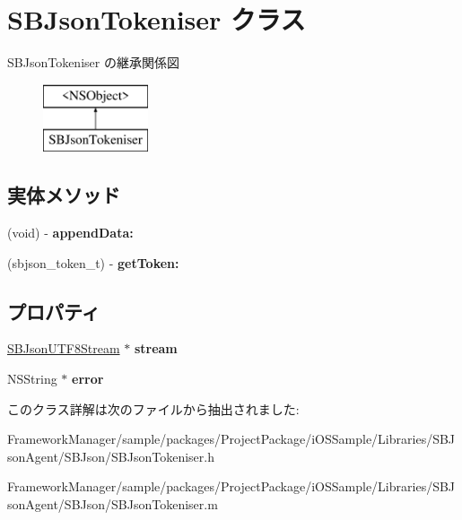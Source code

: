 \hypertarget{interface_s_b_json_tokeniser}{}\section{S\+B\+Json\+Tokeniser クラス}
\label{interface_s_b_json_tokeniser}
S\+B\+Json\+Tokeniser の継承関係図\begin{figure}[H]
\begin{center}
\leavevmode
\includegraphics[height=2.000000cm]{interface_s_b_json_tokeniser}
\end{center}
\end{figure}
\subsection*{実体メソッド}
\begin{DoxyCompactItemize}
\item 
\hypertarget{interface_s_b_json_tokeniser_a8780ad4eed5b72b979dfbaf19bfbd39f}{}(void) -\/ {\bfseries append\+Data\+:}\label{interface_s_b_json_tokeniser_a8780ad4eed5b72b979dfbaf19bfbd39f}

\item 
\hypertarget{interface_s_b_json_tokeniser_a9244d283305dcafc6ec9c4ccfed91e1a}{}(sbjson\+\_\+token\+\_\+t) -\/ {\bfseries get\+Token\+:}\label{interface_s_b_json_tokeniser_a9244d283305dcafc6ec9c4ccfed91e1a}

\end{DoxyCompactItemize}
\subsection*{プロパティ}
\begin{DoxyCompactItemize}
\item 
\hypertarget{interface_s_b_json_tokeniser_aade292df1f9b5af8b184bf2b2f2e08e0}{}\hyperlink{interface_s_b_json_u_t_f8_stream}{S\+B\+Json\+U\+T\+F8\+Stream} $\ast$ {\bfseries stream}\label{interface_s_b_json_tokeniser_aade292df1f9b5af8b184bf2b2f2e08e0}

\item 
\hypertarget{interface_s_b_json_tokeniser_a4f58c75bf79fbaf6e699f10425403704}{}N\+S\+String $\ast$ {\bfseries error}\label{interface_s_b_json_tokeniser_a4f58c75bf79fbaf6e699f10425403704}

\end{DoxyCompactItemize}


このクラス詳解は次のファイルから抽出されました\+:\begin{DoxyCompactItemize}
\item 
Framework\+Manager/sample/packages/\+Project\+Package/i\+O\+S\+Sample/\+Libraries/\+S\+B\+Json\+Agent/\+S\+B\+Json/S\+B\+Json\+Tokeniser.\+h\item 
Framework\+Manager/sample/packages/\+Project\+Package/i\+O\+S\+Sample/\+Libraries/\+S\+B\+Json\+Agent/\+S\+B\+Json/S\+B\+Json\+Tokeniser.\+m\end{DoxyCompactItemize}
